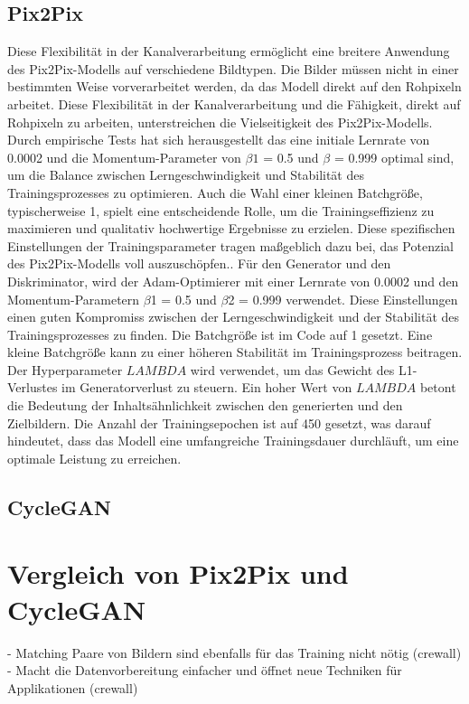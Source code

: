 \subsection{Pix2Pix}
 Diese Flexibilität in der Kanalverarbeitung ermöglicht eine breitere Anwendung des Pix2Pix-Modells auf verschiedene Bildtypen. Die Bilder müssen nicht in einer bestimmten Weise vorverarbeitet werden, da das Modell direkt auf den Rohpixeln arbeitet. Diese Flexibilität in der Kanalverarbeitung und die Fähigkeit, direkt auf Rohpixeln zu arbeiten, unterstreichen die Vielseitigkeit des Pix2Pix-Modells.
  Durch empirische Tests hat sich herausgestellt das eine initiale Lernrate von 0.0002 und die Momentum-Parameter von $\beta1$ = 0.5 und $\beta$ = 0.999 optimal sind, um die Balance zwischen Lerngeschwindigkeit und Stabilität des Trainingsprozesses zu optimieren. Auch die Wahl einer kleinen Batchgröße, typischerweise 1, spielt eine entscheidende Rolle, um die Trainingseffizienz zu maximieren und qualitativ hochwertige Ergebnisse zu erzielen. Diese spezifischen Einstellungen der Trainingsparameter tragen maßgeblich dazu bei, das Potenzial des Pix2Pix-Modells voll auszuschöpfen.\cite{PhillipIsola.}.\newline
  Für den Generator und den Diskriminator, wird der Adam-Optimierer mit einer Lernrate von 0.0002 und den Momentum-Parametern $\beta$1 = 0.5 und $\beta$2 = 0.999 verwendet. Diese Einstellungen einen guten Kompromiss zwischen der Lerngeschwindigkeit und der Stabilität des Trainingsprozesses zu finden. Die Batchgröße ist im Code auf 1 gesetzt. Eine kleine Batchgröße kann zu einer höheren Stabilität im Trainingsprozess beitragen. Der Hyperparameter $LAMBDA$ wird verwendet, um das Gewicht des L1-Verlustes im Generatorverlust zu steuern. Ein hoher Wert von $LAMBDA$ betont die Bedeutung der Inhaltsähnlichkeit zwischen den generierten und den Zielbildern. Die Anzahl der Trainingsepochen ist auf 450 gesetzt, was darauf hindeutet, dass das Modell eine umfangreiche Trainingsdauer durchläuft, um eine optimale Leistung zu erreichen.


\subsection{CycleGAN}

\section{Vergleich von Pix2Pix und CycleGAN}
- Matching Paare von Bildern sind ebenfalls für das Training nicht nötig (crewall)
- Macht die Datenvorbereitung einfacher und öffnet neue Techniken für Applikationen (crewall)